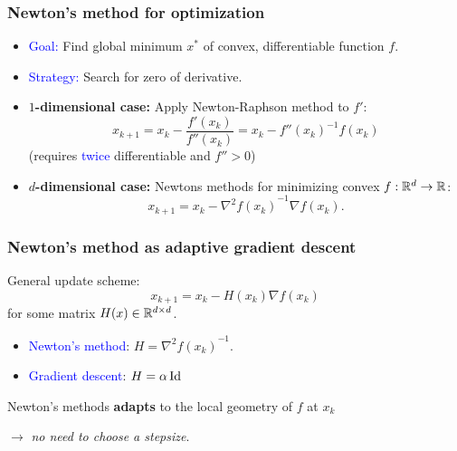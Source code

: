 \documentclass[aspectratio=149]{beamer}
\begin{document}
\begin{frame}
  \frametitle{Newton's method for optimization}
  \begin{itemize}
    \item \textcolor{blue}{Goal:} Find global minimum $x^*$ of convex, differentiable function $f$.
    \item \textcolor{blue}{Strategy:} Search for zero of derivative.
    \item \textbf{$1$-dimensional case:} Apply Newton-Raphson method to $f'$:
          \begin{equation}
            x_{k+1} = x_k - \frac{f'(x_k)}{f''(x_k)} = x_k - {f''(x_k)}^{-1} f(x_k)
          \end{equation}
          (requires \textcolor{blue}{twice} differentiable and $f'' > 0$)

    \item \textbf{$d$-dimensional case:} Newtons methods for minimizing convex $f: \mathbb{R}^d \to \mathbb{R}$:
          \begin{equation}
            x_{k+1} = x_k - {\nabla^2 f(x_k)}^{-1} \nabla f(x_k).
          \end{equation}
  \end{itemize}
\end{frame}


\begin{frame}
  \frametitle{Newton's method as adaptive gradient descent}
  General update scheme:
  \begin{equation}
    x_{k+1} = x_k - H(x_k) \nabla f(x_k)
  \end{equation}
  for some matrix $H(x) \in \mathbb{R}^{d \times d}$.
  \begin{itemize}
    \item \textcolor{blue}{Newton's method}: $H = {\nabla^2 f(x_k)}^{-1}$.
    \item \textcolor{blue}{Gradient descent}: $H = \alpha \operatorname*{Id}$
  \end{itemize}
  \vspace{1cm}
 \begin{block}{}
  Newton's methods \textbf{adapts} to the local geometry of $f$ at $x_k$ \\
 \end{block}
  $\rightarrow$ \textit{no need to choose a stepsize}.
\end{frame}
\end{document}
